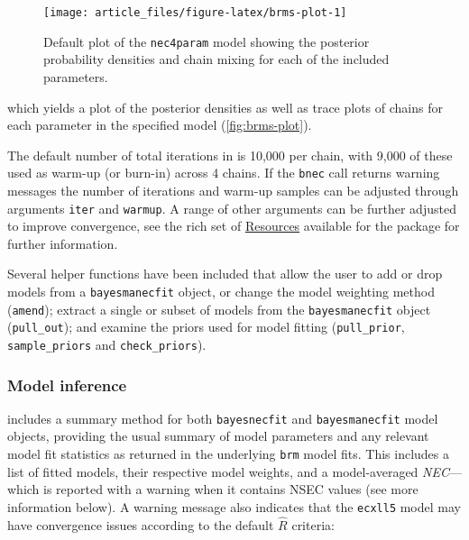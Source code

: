 \documentclass[
]{jss}
\begin{document}
\begin{CodeChunk}
\begin{figure}

{\centering \texttt{[image: article\_files/figure-latex/brms-plot-1]} 

}

\caption[Default  plot of the \texttt{nec4param} model showing the posterior probability densities and chain mixing for each of the included parameters]{Default  plot of the \texttt{nec4param} model showing the posterior probability densities and chain mixing for each of the included parameters.}\label{fig:brms-plot}
\end{figure}
\end{CodeChunk}

\newpage

which yields a plot of the posterior densities as well as trace plots of
chains for each parameter in the specified model
(\autoref{fig:brms-plot}).

The default number of total iterations in  is 10,000 per
chain, with 9,000 of these used as warm-up (or burn-in) across 4 chains.
If the \texttt{bnec} call returns  warning messages the number
of iterations and warm-up samples can be adjusted through arguments
\texttt{iter} and \texttt{warmup}. A range of other arguments can be
further adjusted to improve convergence, see the rich set of
\href{https://github.com/paul-buerkner/brms}{Resources} available for
the  package for further information.

Several helper functions have been included that allow the user to add
or drop models from a \texttt{bayesmanecfit} object, or change the model
weighting method (\texttt{amend}); extract a single or subset of models
from the \texttt{bayesmanecfit} object (\texttt{pull\_out}); and examine
the priors used for model fitting (\texttt{pull\_prior},
\texttt{sample\_priors} and \texttt{check\_priors}).

\hypertarget{model-inference}{%
\subsubsection{Model inference}\label{model-inference}}

 includes a summary method for both \texttt{bayesnecfit}
and \texttt{bayesmanecfit} model objects, providing the usual summary of
model parameters and any relevant model fit statistics as returned in
the underlying \texttt{brm} model fits. This includes a list of fitted
models, their respective model weights, and a model-averaged
\emph{NEC}---which is reported with a warning when it contains NSEC
values (see more information below). A warning message also indicates
that the \texttt{ecxll5} model may have convergence issues according to
the default  \(\widehat{R}\) criteria:
\end{document}
